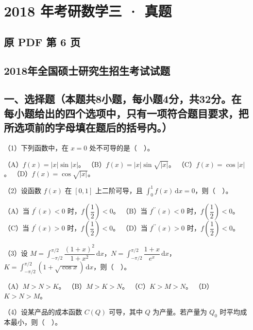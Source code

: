 \documentclass[UTF8,12pt]{ctexart}
\begin{document}
\section*{2018 年考研数学三 · 真题}
\subsection*{原 PDF 第 6 页}

\subsection*{2018年全国硕士研究生招生考试试题}

\subsection*{一、选择题（本题共8小题，每小题4分，共32分。在每小题给出的四个选项中，只有一项符合题目要求，把所选项前的字母填在题后的括号内。）}

（1）下列函数中，在 \(\displaystyle x=0\) 处不可导的是（　）。


（A）\(\displaystyle f(x)=|x|\sin|x|\)。 （B）\(\displaystyle f(x)=|x|\sin\sqrt{|x|}\)。 （C）\(\displaystyle f(x)=\cos|x|\)。 （D）\(\displaystyle f(x)=\cos\sqrt{|x|}\)。


（2）设函数 \(\displaystyle f(x)\) 在 \(\displaystyle [0,\allowbreak 1]\) 上二阶可导，且 \(\displaystyle \int_0^1f(x)\,\mathrm dx=0\)，则（　）。


（A）当 \(\displaystyle f^{\prime}(x)<0\) 时，\(\displaystyle f(\dfrac{\displaystyle 1}{\displaystyle 2})<0\)。 （B）当 \(\displaystyle f^{\prime\prime}(x)<0\) 时，\(\displaystyle f(\dfrac{\displaystyle 1}{\displaystyle 2})<0\)。 （C）当 \(\displaystyle f^{\prime}(x)>0\) 时，\(\displaystyle f(\dfrac{\displaystyle 1}{\displaystyle 2})<0\)。 （D）当 \(\displaystyle f^{\prime\prime}(x)>0\) 时，\(\displaystyle f(\dfrac{\displaystyle 1}{\displaystyle 2})<0\)。


（3）设 \(\displaystyle M=\displaystyle \int_{-\pi/2}^{\pi/2}\dfrac{\displaystyle (1+x)^2}{\displaystyle 1+x^2}\,\mathrm dx\)，\(\displaystyle N=\displaystyle \int_{-\pi/2}^{\pi/2}\dfrac{\displaystyle 1+x}{\displaystyle e^x}\,\mathrm dx\)，\(\displaystyle K=\displaystyle \int_{-\pi/2}^{\pi/2}(1+\sqrt{\cos x})\,\mathrm dx\)，则（　）。


（A）\(\displaystyle M>N>K\)。 （B）\(\displaystyle M>K>N\)。 （C）\(\displaystyle K>M>N\)。 （D）\(\displaystyle K>N>M\)。


（4）设某产品的成本函数 \(\displaystyle C(Q)\) 可导，其中 \(\displaystyle Q\) 为产量。若产量为 \(\displaystyle Q_0\) 时平均成本最小，则（　）。
\end{document}

